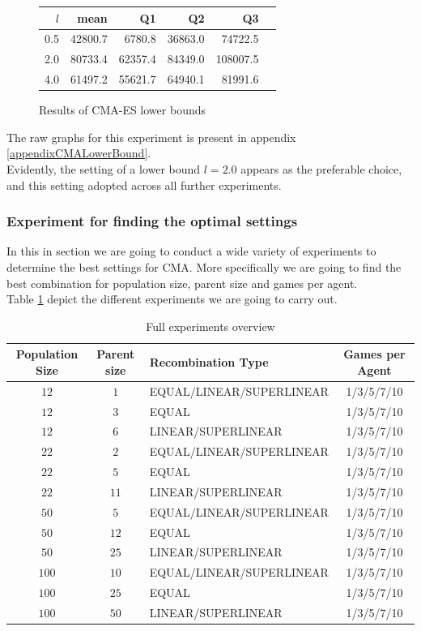 \begin{figure}[H]
\centering
\begin{tabular}{r | r r r r r}
$l$ & mean & Q1 & Q2 & Q3\\
\hline
0.5 & 42800.7 & 6780.8  & 36863.0 & 74722.5\\
2.0 & 80733.4 & 62357.4 & 84349.0 & 108007.5\\
4.0 & 61497.2 & 55621.7 & 64940.1 & 81991.6\\
\end{tabular}
\caption{Results of CMA-ES lower bounds \label{CMALowerBoundConfigTest}}
\end{figure}
The raw graphs for this experiment is present in appendix \ref{appendixCMALowerBound}.\\
Evidently, the setting of a lower bound $l=2.0$ appears as the preferable choice, and this 
setting adopted across all further experiments.


\subsubsection{Experiment for finding the optimal settings \label{OptimalSettingsCMA}}
In this in section we are going to conduct a wide variety of experiments to determine
the best settings for CMA. More specifically we are going to find the best combination for
population size, parent size and games per agent.\\
Table \ref{SuperCMAExperiment} depict the different experiments we are
going to carry out.

\begin{table}[H]
\centering
\begin{tabular}{c c l c}
Population Size & Parent size & Recombination Type & Games per Agent\\
\hline
$12$ & $1$ & EQUAL/LINEAR/SUPERLINEAR & 1/3/5/7/10\\
$12$ & $3$ & EQUAL & 1/3/5/7/10\\
$12$ & $6$ & LINEAR/SUPERLINEAR & 1/3/5/7/10\\
$22$ & $2$ & EQUAL/LINEAR/SUPERLINEAR & 1/3/5/7/10\\
$22$ & $5$ & EQUAL & 1/3/5/7/10\\
$22$ & $11$ & LINEAR/SUPERLINEAR & 1/3/5/7/10\\
$50$ & $5$ & EQUAL/LINEAR/SUPERLINEAR & 1/3/5/7/10\\
$50$ & $12$ & EQUAL & 1/3/5/7/10\\
$50$ & $25$ & LINEAR/SUPERLINEAR & 1/3/5/7/10\\
$100$ & $10$ & EQUAL/LINEAR/SUPERLINEAR & 1/3/5/7/10\\
$100$ & $25$ & EQUAL & 1/3/5/7/10\\
$100$ & $50$ & LINEAR/SUPERLINEAR & 1/3/5/7/10
\end{tabular}
\caption{Full experiments overview \label{SuperCMAExperiment}}
\end{table}

